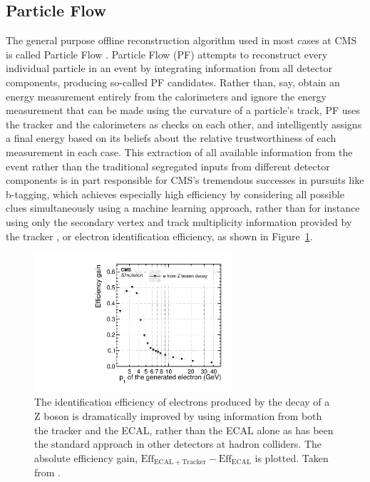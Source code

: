   \subsection{Particle Flow} \label{sec:particleflow}

  The general purpose offline reconstruction algorithm used in most cases at CMS is called Particle Flow \cite{particleflow}.
  Particle Flow (PF) attempts to reconstruct every individual particle in an event by integrating information from all detector components, producing so-called PF candidates.
  Rather than, say, obtain an energy measurement entirely from the calorimeters and ignore the energy measurement that can be made using the curvature of a particle's track, PF uses the tracker and the calorimeters as checks on each other, and intelligently assigns a final energy based on its beliefs about the relative trustworthiness of each measurement in each case.
  This extraction of all available information from the event rather than the traditional segregated inputs from different detector components is in part responsible for CMS's tremendous successes in pursuits like b-tagging, which achieves especially high efficiency by considering all possible clues simultaneously using a machine learning approach, rather than for instance using only the secondary vertex and track multiplicity information provided by the tracker \cite{particleflow}, or electron identification efficiency, as shown in Figure~\ref{fig:PFimprovement}.
  
    \begin{figure}[h!]
      \centering
      \includegraphics[width=0.65\textwidth]{figures/pfimprovement.pdf}
      \caption[Improvement of electron identification efficiency as a function of \pt using an integrated reconstruction approach like Particle Flow.]{
        The identification efficiency of electrons produced by the decay of a Z boson is dramatically improved by using information from both the tracker and the ECAL, rather than the ECAL alone as has been the standard approach in other detectors at hadron colliders.
        The absolute efficiency gain, $\mathrm{Eff}_{\mathrm{ECAL}+\mathrm{Tracker}}-\mathrm{Eff}_{\mathrm{ECAL}}$ is plotted.
        Taken from \cite{particleflow}.}
      \label{fig:PFimprovement}
    \end{figure}  


